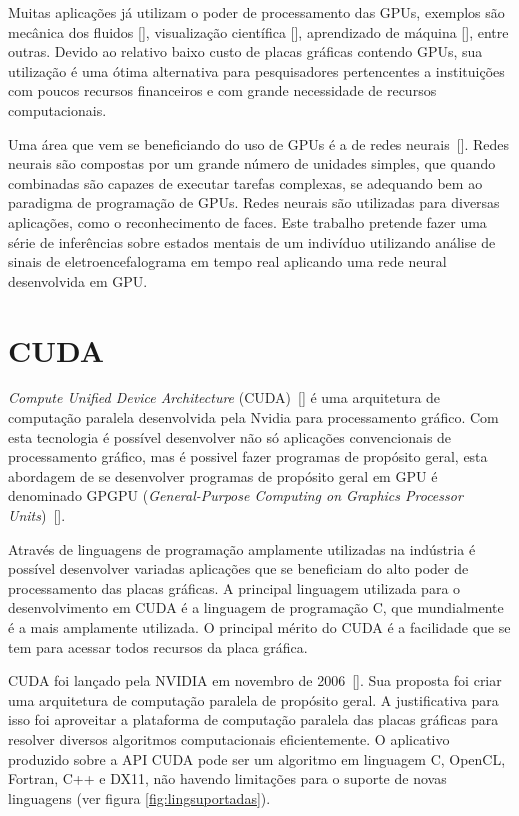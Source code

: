Muitas aplicações já utilizam o poder de processamento das GPUs, exemplos são mecânica dos fluidos [\cite{fluido}], visualização científica [\cite{visualizacao}],  aprendizado de máquina [\cite{Aprendizado}], entre outras. Devido ao relativo baixo custo de placas gráficas contendo GPUs, sua utilização é uma ótima alternativa para pesquisadores pertencentes a instituições com poucos recursos financeiros e com grande necessidade de recursos computacionais.

Uma área que vem se beneficiando do uso de GPUs é a de redes neurais~[\cite{gpuNeural}]. Redes neurais são compostas por um grande número de unidades simples, que quando combinadas são capazes de executar tarefas complexas, se adequando bem ao paradigma de programação de GPUs. Redes neurais são utilizadas para diversas aplicações, como o reconhecimento de faces.
Este trabalho pretende fazer uma série de inferências sobre estados mentais de um indivíduo utilizando análise de sinais de eletroencefalograma em tempo real aplicando uma rede neural desenvolvida em GPU.


\section{CUDA}\label{intro:contexto}

\textit{Compute Unified Device Architecture} (CUDA)~[\cite{cuda}] é uma arquitetura de computação paralela desenvolvida pela Nvidia para processamento gráfico.
Com esta tecnologia é possível desenvolver não só aplicações convencionais de processamento gráfico, mas é possivel fazer programas de propósito geral, esta abordagem de se desenvolver programas de propósito geral em GPU é denominado GPGPU (\textit{General-Purpose Computing on Graphics Processor Units})~[\cite{GPGPU}].

Através de linguagens de programação amplamente utilizadas na indústria é possível desenvolver variadas aplicações que se beneficiam do alto poder de processamento das placas gráficas. A principal linguagem utilizada para o desenvolvimento em CUDA é a linguagem de
programação C, que mundialmente é a mais amplamente utilizada. O principal mérito do CUDA é a facilidade que se tem para acessar todos recursos da placa gráfica.

CUDA foi lançado pela NVIDIA em novembro de 2006~[\cite{cuda}]. Sua proposta foi criar uma arquitetura de computação paralela de propósito geral. A justificativa para isso foi aproveitar a plataforma de computação paralela das placas gráficas para resolver diversos algoritmos
computacionais eficientemente. O aplicativo produzido sobre a API CUDA pode ser um algoritmo em linguagem C, OpenCL, Fortran, C++ e DX11, não havendo limitações para o suporte de novas linguagens (ver figura \ref{fig:lingsuportadas}). 

